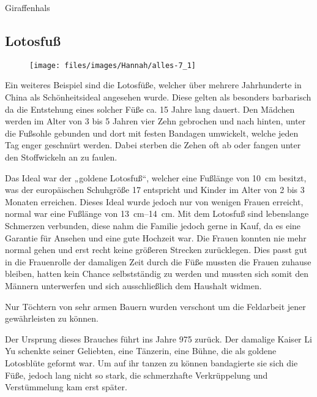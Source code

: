 \begin{figurewrapper} %
	 \hfill
	\caption{Giraffenhals}
\end{figurewrapper}

\subsection{Lotosfuß}

\begin{wrapfigure}{r}{0pt}
	\texttt{[image: files/images/Hannah/alles-7\_1]}%
\end{wrapfigure}
Ein weiteres Beispiel sind die Lotosfüße, welcher über
mehrere Jahrhunderte in China als Schönheitsideal angesehen wurde.
Diese gelten als besonders barbarisch da die Entstehung eines solcher Füße ca. 15 Jahre lang dauert.
Den Mädchen werden im Alter von 3 bis 5 Jahren vier Zehn gebrochen und nach hinten, unter die
Fußsohle gebunden und dort mit festen Bandagen umwickelt, welche jeden Tag enger geschnürt werden.
Dabei sterben die Zehen oft ab oder fangen unter den Stoffwickeln an zu faulen.

Das Ideal war der „goldene Lotosfuß“, welcher eine Fußlänge von \SI{10}{\centi\metre} besitzt,
was der europäischen Schuhgröße 17 entspricht und Kinder im Alter von 2 bis 3 Monaten erreichen.
Dieses
Ideal wurde jedoch nur von wenigen Frauen erreicht, normal war eine Fußlänge von
\SIrange{13}{14}{\centi\metre}. Mit dem Lotosfuß sind lebenslange Schmerzen verbunden, diese nahm
die Familie jedoch gerne in Kauf, da es eine Garantie für Ansehen und eine gute Hochzeit war. Die
Frauen konnten nie mehr normal gehen und erst recht keine größeren Strecken zurücklegen. Dies passt
gut in die Frauenrolle der damaligen Zeit durch die Füße mussten die Frauen zuhause bleiben, hatten
kein Chance selbstständig zu werden und mussten sich somit den Männern unterwerfen und sich
ausschließlich dem Haushalt widmen.

Nur Töchtern von sehr armen Bauern wurden verschont um die Feldarbeit jener gewährleisten zu können.

Der Ursprung dieses Brauches führt ins Jahre 975 zurück. Der damalige Kaiser Li Yu schenkte seiner
Geliebten, eine Tänzerin, eine Bühne, die als goldene Lotosblüte geformt war. Um auf ihr tanzen
zu können bandagierte sie sich die Füße, jedoch lang nicht so stark, die schmerzhafte Verkrüppelung
und Verstümmelung kam erst später.

